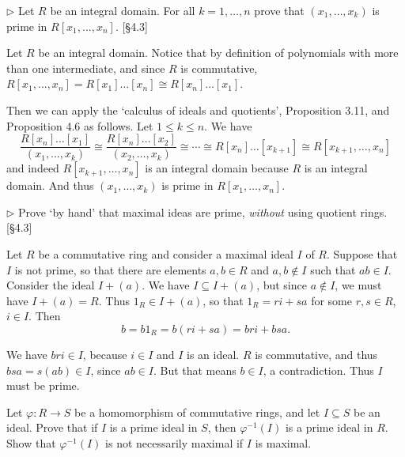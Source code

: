 \begin{problem}
	$\triangleright$ Let $R$ be an integral domain. For all $k = 1, \dots, n$ prove that $(x_1, \dots, x_k)$ is prime in $R[x_1, \dots, x_n]$. [\S 4.3]
\end{problem}

\begin{solution}
	Let $R$ be an integral domain. Notice that by definition of polynomials with more than one intermediate, and since $R$ is commutative, $R[x_1, \dots, x_n] = R[x_1]\dots[x_n] \cong R[x_n]\dots[x_1]$.
	
	Then we can apply the `calculus of ideals and quotients', Proposition 3.11, and Proposition 4.6 as follows. Let $1 \leq k \leq n$. We have
	\[
		\frac{R[x_n]\dots[x_1]}{(x_1, \dots, x_k)} \cong \frac{R[x_n]\dots[x_2]}{(x_2, \dots, x_k)} \cong \cdots \cong R[x_n]\dots[x_{k+1}] \cong R[x_{k+1}, \dots, x_n]
	\]
	and indeed $R[x_{k+1}, \dots, x_n]$ is an integral domain because $R$ is an integral domain. And thus $(x_1, \dots, x_k)$ is prime in $R[x_1, \dots, x_n]$.
\end{solution}

\begin{problem}
	$\triangleright$ Prove `by hand' that maximal ideas are prime, \emph{without} using quotient rings. [\S 4.3]
\end{problem}

\begin{solution}
	Let $R$ be a commutative ring and consider a maximal ideal $I$ of $R$. Suppose that $I$ is not prime, so that there are elements $a, b \in R$ and $a, b \not \in I$ such that $ab \in I$. Consider the ideal $I + (a)$. We have $I \subseteq I + (a)$, but since $a \not \in I$, we must have $I + (a) = R$. Thus $1_R \in I + (a)$, so that $1_R = r i + s a$ for some $r, s \in R$, $i \in I$. Then
	\[
		b = b 1_R = b(r i + s a) = b r i + b s a \text{.}
	\]
	
	We have $bri \in I$, because $i \in I$ and $I$ is an ideal. $R$ is commutative, and thus $bsa = s(ab) \in I$, since $ab \in I$. But that means $b \in I$, a contradiction. Thus $I$ must be prime.
\end{solution}

\begin{problem}
	Let $\varphi: R \to S$ be a homomorphism of commutative rings, and let $I \subseteq S$ be an ideal. Prove that if $I$ is a prime ideal in $S$, then $\varphi^{-1}(I)$ is a prime ideal in $R$. Show that $\varphi^{-1}(I)$ is not necessarily maximal if $I$ is maximal.
\end{problem}

